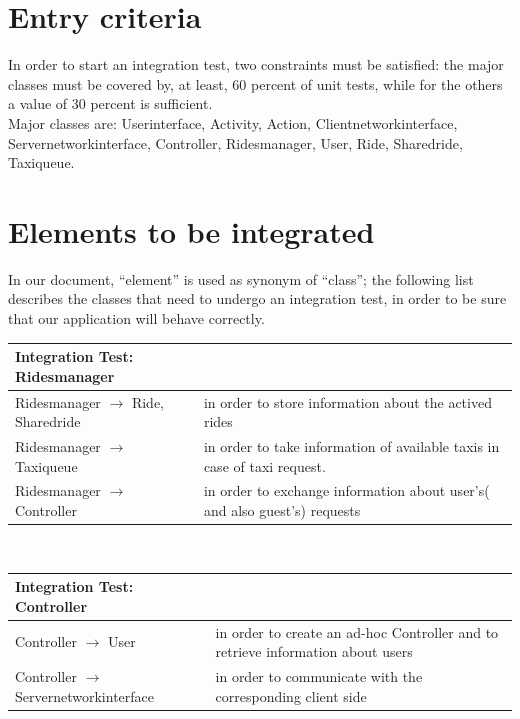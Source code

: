 \section{Entry criteria}
In order to start an integration test, two constraints must be satisfied:
the major classes must be covered by, at least, 60 percent of unit tests, 
while for the others a value of 30 percent is sufficient.\\
Major classes are: Userinterface, Activity, Action, Clientnetworkinterface,
Servernetworkinterface, Controller, Ridesmanager, User, Ride, Sharedride,
Taxiqueue.

\section{Elements to be integrated}
In our document, ``element'' is used as synonym of ``class'';
the following list describes the classes that need to undergo an integration test, 
in order to be sure that our application will behave correctly.

\vspace{5mm}
\begin{tabular*}{1.21\textwidth}{ l p{7cm}}
 \textbf{Integration Test}: Ridesmanager	&  \\
 \hline
  Ridesmanager $\rightarrow$ Ride, Sharedride & in order to store information about the actived rides \\  
 \hline
 Ridesmanager $\rightarrow$ Taxiqueue & in order to take information of available taxis  in case of taxi request. \\
 \hline
 Ridesmanager $\rightarrow$ Controller & in order to exchange information about user's( and also guest's) requests\\
 \hline
 \end{tabular*}\\

\vspace{5mm}
\begin{tabular*}{1.21\textwidth}{ l p{7cm}}
\textbf{Integration Test}: Controller		&  \\
\hline
 Controller $\rightarrow$ User &  in order to create an ad-hoc Controller and to retrieve information about users \\  
 \hline
 Controller $\rightarrow$ Servernetworkinterface &  in order to communicate with the corresponding client side\\
 \hline
 \end{tabular*}\\

